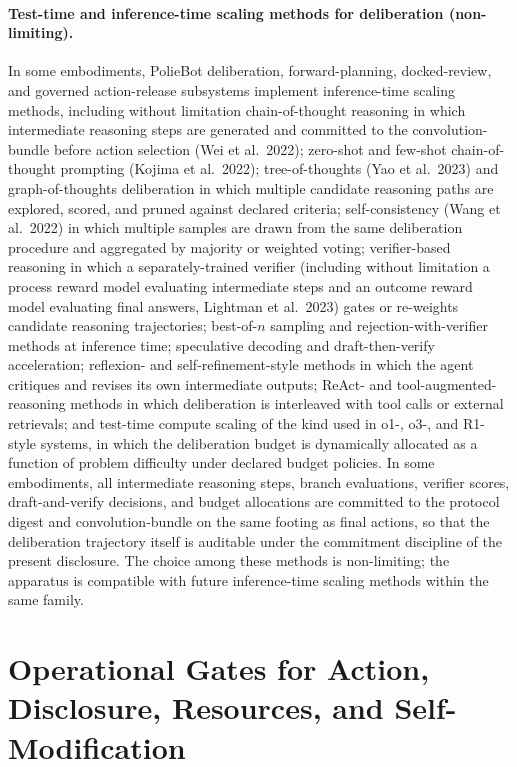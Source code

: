 \documentclass[a4paper,12pt]{article}
\begin{document}
\paragraph{Test-time and inference-time scaling methods for
  deliberation (non-limiting).}
In some embodiments, PolieBot deliberation, forward-planning,
docked-review, and governed action-release subsystems implement
inference-time scaling methods, including without limitation
chain-of-thought reasoning in which intermediate reasoning steps
are generated and committed to the convolution-bundle before
action selection (Wei et al.\ 2022); zero-shot and few-shot
chain-of-thought prompting (Kojima et al.\ 2022);
tree-of-thoughts (Yao et al.\ 2023) and graph-of-thoughts
deliberation in which multiple candidate reasoning paths are
explored, scored, and pruned against declared criteria;
self-consistency (Wang et al.\ 2022) in which multiple samples
are drawn from the same deliberation procedure and aggregated by
majority or weighted voting; verifier-based reasoning in which a
separately-trained verifier (including without limitation a
process reward model evaluating intermediate steps and an outcome
reward model evaluating final answers, Lightman et al.\ 2023)
gates or re-weights candidate reasoning trajectories;
best-of-$n$ sampling and rejection-with-verifier methods at
inference time; speculative decoding and draft-then-verify
acceleration; reflexion- and self-refinement-style methods in
which the agent critiques and revises its own intermediate outputs;
ReAct- and tool-augmented-reasoning methods in which deliberation
is interleaved with tool calls or external retrievals; and
test-time compute scaling of the kind used in o1-, o3-, and
R1-style systems, in which the deliberation budget is dynamically
allocated as a function of problem difficulty under declared budget
policies. In some embodiments, all intermediate reasoning steps,
branch evaluations, verifier scores, draft-and-verify decisions,
and budget allocations are committed to the protocol digest and
convolution-bundle on the same footing as final actions, so that
the deliberation trajectory itself is auditable under the
commitment discipline of the present disclosure. The choice among
these methods is non-limiting; the apparatus is compatible with
future inference-time scaling methods within the same family.

\section{Operational Gates for Action, Disclosure, Resources, and
  Self-Modification}
\end{document}
